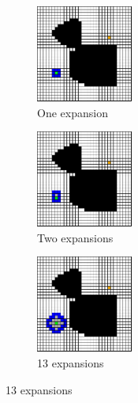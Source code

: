 \begin{figure}
  \begin{center}
    \begin{subfigure}[t]{0.3\textwidth}
      \includegraphics[width=1.25in]{planning/figs/dijkstra_0001.pdf}
       \caption{One expansion}
    \end{subfigure}
    \begin{subfigure}[t]{0.3\textwidth}
      \includegraphics[width=1.25in]{planning/figs/dijkstra_0002.pdf}
       \caption{Two expansions}
    \end{subfigure}
    \begin{subfigure}[t]{0.3\textwidth}
      \includegraphics[width=1.25in]{planning/figs/dijkstra_0013.pdf}
       \caption{13 expansions}
    \end{subfigure}

    \vspace{.2in}


\end{center}
\end{figure}
